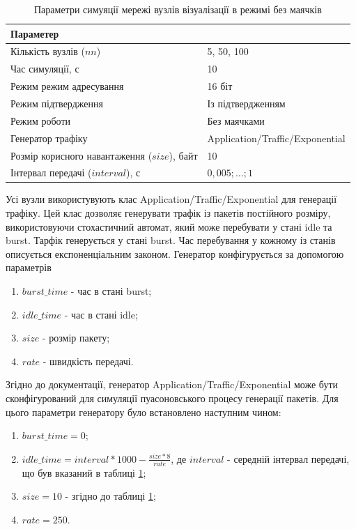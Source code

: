 \documentclass[a4paper,ukrainian,utf8,nocolumnsxix,floatsection,equationsection]{eskdtext}
\begin{document}
\begin{table}[htbp]
\caption{Параметри симуяції мережі вузлів візуалізації в режимі без маячків}
\centering
\begin{tabular}{|l|l|}
	\hline
	Параметер                                    &                                 \\ \hline
	Кількість вузлів ($nn$)                      & 5, 50, 100                      \\ \hline
	Час симуляції, с                             & 10                              \\ \hline
	Режим режим адресування                      & 16 біт                          \\ \hline
	Режим підтвердження                          & Із підтвердженням               \\ \hline
	Режим роботи                                 & Без маячками                    \\ \hline
	Генератор трафіку                            & Application/Traffic/Exponential \\ \hline
	Розмір корисного навантаження ($size$), байт & 10                              \\ \hline
	Інтервал передачі ($interval$), с            & $0,005;\dots;1$                \\ \hline
\end{tabular}
\label{tbl:simulation_backtraf_nobeac_nobrd}
\end{table}

Усі вузли використувують клас Application/Traffic/Exponential для генерації трафіку. Цей клас дозволяє генерувати трафік із пакетів постійного розміру, використовуючи стохастичний автомат, який може перебувати у стані idle та burst. Тарфік генерується у стані burst. Час перебування у кожному із станів описується експоненціальним законом. Генератор конфігурується за допомогою параметрів 
\begin{enumerate}
	\item $burst\_time$ - час в стані burst;
	\item $idle\_time$ - час в стані idle;
	\item $size$ - розмір пакету;
	\item $rate$ - швидкість передачі.
\end{enumerate}

Згідно до документації, генератор Application/Traffic/Exponential може бути сконфігурований для симуляції пуасоновського процесу генерації пакетів. Для цього параметри генератору було встановлено наступним чином:
\begin{enumerate}
	\item $burst\_time = 0$;
	\item $idle\_time = interval*1000 - \frac{size*8}{rate}$, де $interval$ - середній інтервал передачі, що був вказаний в таблиці \ref{tbl:simulation_backtraf_nobeac_nobrd};
	\item $size = 10$ - згідно до таблиці \ref{tbl:simulation_backtraf_nobeac_nobrd};
	\item $rate = 250$.
\end{enumerate}
\end{document}

